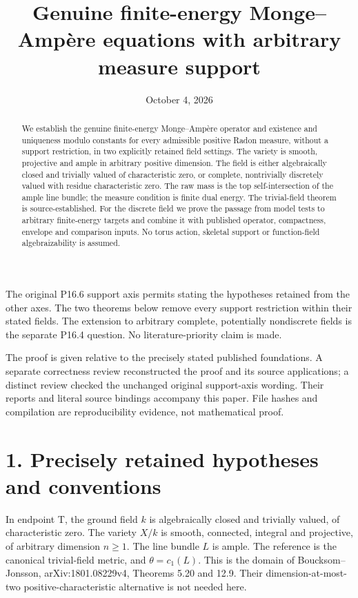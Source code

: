 \documentclass[11pt]{article}
\title{Genuine finite-energy Monge--Amp\`ere equations with arbitrary measure support}
\author{}
\date{October 4, 2026}
\begin{document}
\maketitle

\begin{abstract}
We establish the genuine finite-energy Monge--Amp\`ere operator and
existence and uniqueness modulo constants for every admissible positive
Radon measure, without a support restriction, in two explicitly retained
field settings. The variety is smooth, projective and ample in arbitrary
positive dimension. The field is either algebraically closed and
trivially valued of characteristic zero, or complete, nontrivially
discretely valued with residue characteristic zero. The raw mass is the
top self-intersection of the ample line bundle; the measure condition is
finite dual energy. The trivial-field theorem is source-established.
For the discrete field we prove the passage from model tests to
arbitrary finite-energy targets and combine it with published operator,
compactness, envelope and comparison inputs. No torus action, skeletal
support or function-field algebraizability is assumed.
\end{abstract}

The original P16.6 support axis permits stating the hypotheses retained
from the other axes. The two theorems below remove every support
restriction within their stated fields. The extension to arbitrary
complete, potentially nondiscrete fields is the separate P16.4 question.
No literature-priority claim is made.

The proof is given relative to the precisely stated published
foundations. A separate correctness review reconstructed the proof and
its source applications; a distinct review checked the unchanged
original support-axis wording. Their reports and literal source
bindings accompany this paper. File hashes and compilation are
reproducibility evidence, not mathematical proof.

\section*{1. Precisely retained hypotheses and conventions}

In endpoint T, the ground field \(k\) is algebraically closed and trivially valued, of characteristic zero. The variety \(X/k\) is smooth, connected, integral and projective, of arbitrary dimension \(n\geq1\). The line bundle \(L\) is ample. The reference is the canonical trivial-field metric, and \(\theta=c_1(L)\). This is the domain of Boucksom--Jonsson, arXiv:1801.08229v4, Theorems 5.20 and 12.9. Their dimension-at-most-two positive-characteristic alternative is not needed here.
\end{document}
